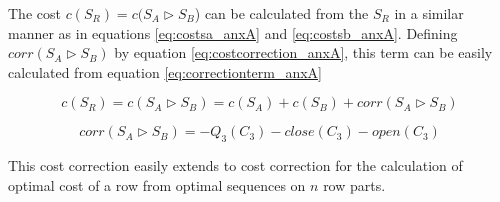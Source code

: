 The cost $c(S_R)=c(S_A \triangleright S_B$) can be calculated from the $S_R$ in a similar manner as in equations \ref{eq:costsa_anxA} and \ref{eq:costsb_anxA}. Defining $corr(S_A \triangleright S_B)$ by equation \ref{eq:costcorrection_anxA}, this term can be easily calculated from equation \ref{eq:correctionterm_anxA}

\begin{equation}
	c(S_R)=c(S_A \triangleright S_B)=c(S_A)+c(S_B)+corr(S_A \triangleright S_B) \label{eq:costcorrection_anxA}
\end{equation}

\begin{equation}
	corr(S_A \triangleright S_B)= - Q_{3}(C_{3}) - close(C_{3}) - open(C_{3}) \label{eq:correctionterm_anxA}
\end{equation}

This cost correction easily extends to cost correction for the calculation of optimal cost of a row from optimal sequences on $n$ row parts.
